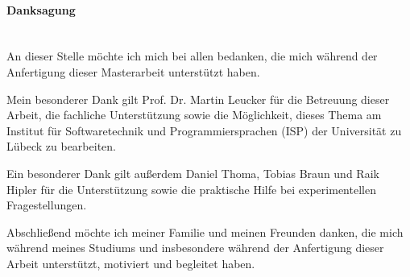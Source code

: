 
\cleardoublepage
\thispagestyle{plain}

\paragraph{Danksagung}\mbox{}\\


An dieser Stelle möchte ich mich bei allen bedanken, die mich während der Anfertigung
dieser Masterarbeit unterstützt haben.

Mein besonderer Dank gilt Prof. Dr. Martin Leucker für die Betreuung dieser Arbeit, die
fachliche Unterstützung sowie die Möglichkeit, dieses Thema am Institut für Softwaretechnik und Programmiersprachen (ISP) der Universität zu Lübeck zu bearbeiten.

Ein besonderer Dank gilt außerdem Daniel Thoma, Tobias Braun und Raik Hipler für die Unterstützung sowie die praktische Hilfe bei experimentellen Fragestellungen.

Abschließend möchte ich meiner Familie und meinen Freunden danken, die mich während
meines Studiums und insbesondere während der Anfertigung dieser Arbeit unterstützt,
motiviert und begleitet haben.